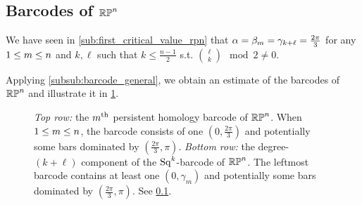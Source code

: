 \subsection{Barcodes of $\mathbb{RP}^n$}\label{sub:barcode_rpn}


We have seen in \cref{sub:first_critical_value_rpn} that $\alpha = \beta_m = \gamma_{k+\ell} = \tfrac{2\pi}{3}$ for any $1 \leq m \leq n$ and $k, \ell$ such that $k \leq \frac{n-1}{2}$ s.t. $\binom{\ell}{k} \mod 2\neq 0$.

Applying \cref{subsub:barcode_general}, we obtain an estimate of the barcodes of $\mathbb{RP}^n$ and illustrate it in \cref{fig:sq barcodes}.

\begin{figure}
	\centering
	
	\caption{\emph{Top row:} the $m^{\mathrm{th}}$ persistent homology barcode of $\mathbb{RP}^n$.
		When $1\leq m \leq n$, the barcode consists of one $(0,\frac{2\pi}{3})$ and potentially some bars dominated by $(\frac{2\pi}{3}, \pi)$.
		\emph{Bottom row:} the degree-$(k+\ell)$ component of the $\operatorname{Sq}^k$-barcode of $\mathbb{RP}^n$.
		The leftmost barcode contains at least one $(0,\gamma_m)$ and potentially some bars dominated by $(\frac{2\pi}{3}, \pi)$.
		See \cref{sub:barcode_rpn}.
	}
	\label{fig:sq barcodes}
\end{figure}
